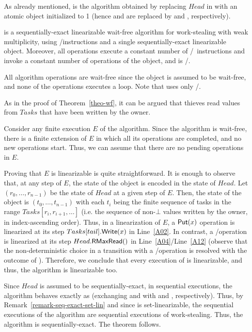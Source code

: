 As already mentioned, \NCWSM is the algorithm obtained by replacing \(Head\) in \WFWSM with an atomic \RangeMaxReg object initialized to 1 (hence \MaxR and \MaxW are replaced by \RMaxR and \RMaxW, respectively).


\begin{theorem}\label{theo-wf-nc}
  \NCWSM is a sequentially-exact linearizable wait-free algorithm for work-stealing with weak multiplicity, using \R/\W instructions and a single sequentially-exact linearizable \RangeMaxReg object. Moreover, all operations execute a constant number of \R/\W\ instructions and invoke a constant number of operations of the \RangeMaxReg object, and \Put is \R/\W.
\end{theorem}

\begin{proofT}
All algorithm operations are wait-free since the \RangeMaxReg object is assumed to be wait-free, and none of the operations executes a loop. Note that \Put uses only \R/\W.

As in the proof of Theorem~\ref{theo-wf}, it can be argued that thieves read values from \(Tasks\) that have been written by the owner.

Consider any finite execution \(E\) of the algorithm. Since the algorithm is wait-free, there is a finite extension of \(E\) in which all its operations are completed, and no new operations start. Thus, we can assume that there are no pending operations in \(E\).

Proving that \(E\) is linearizable is quite straightforward. It is enough to observe that, at any step of \(E\), the state of the object is encoded in the state of \(Head\). Let \((r_0, \hdots, r_{n-1})\) be the state of \(Head\) at a given step of \(E\). Then, the state of the object is \((t_0, \hdots, t_{n-1})\) with each \(t_i\) being the finite sequence of tasks in the range \(Tasks[r_i, r_{i+1}, \hdots]\) (i.e. the sequence of non-\(\bot\) values written by the owner, in index-ascending order).  Thus, in a linearization of \(E\), a \({\sf Put}(x)\) operation is linearized at its step \(Tasks[tail].{\sf Write}(x)\) in Line~\ref{A02}. In contrast, a \Take/\Steal operation is linearized at its step \(Head.{\sf RMaxRead}()\) in Line~\ref{A04}/Line~\ref{A12} (observe that the non-deterministic choice in a transition with a \Take/\Steal operation is resolved with the outcome of \RMaxR). Therefore, we conclude that every execution of \NCWSM is linearizable, and thus, the algorithm is linearizable too.

Since $Head$ is assumed to be sequentially-exact, in sequential executions, the algorithm behaves exactly as \WFWSM (exchanging \RMaxR and \RMaxW with \MaxR and \MaxW, respectively). Thus, by Remark~\ref{remark-seq-exact-set-lin} and since \WFWSM is set-linearizable, the sequential executions of the algorithm are sequential executions of work-stealing. Thus, the algorithm is sequentially-exact. The theorem follows.

\end{proofT}

